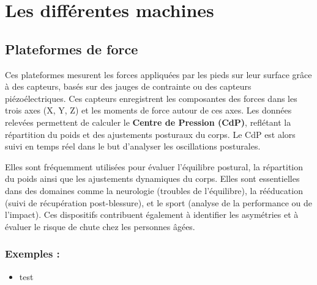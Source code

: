 \section{Les différentes machines}

\subsection{Plateformes de force}

Ces plateformes mesurent les forces appliquées par les pieds sur leur surface grâce à des capteurs, basés sur des jauges de contrainte ou des capteurs piézoélectriques. 
Ces capteurs enregistrent les composantes des forces dans les trois axes (X, Y, Z) et les moments de force autour de ces axes. 
Les données relevées permettent de calculer le \textbf{Centre de Pression (CdP)}, reflétant la répartition du poids et des ajustements posturaux du corps. 
Le CdP est alors suivi en temps réel dans le but d'analyser les oscillations posturales.

Elles sont fréquemment utilisées pour évaluer l’équilibre postural, la répartition du poids ainsi que les ajustements dynamiques du corps. 
Elles sont essentielles dans des domaines comme la neurologie (troubles de l’équilibre), la rééducation (suivi de récupération post-blessure), et le sport (analyse de la performance ou de l’impact). 
Ces dispositifs contribuent également à identifier les asymétries et à évaluer le risque de chute chez les personnes âgées.

\subsubsection{Exemples :}
\begin{itemize}
  \item test
\end{itemize}
